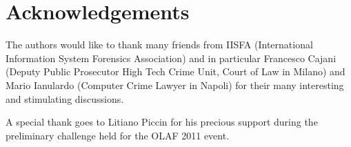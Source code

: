 \documentclass[10pt, conference]{IEEEtran}
\begin{document}
\section*{Acknowledgements}
The authors would like to thank many friends from IISFA (International Information System Forensics Association) and in particular 
Francesco Cajani (Deputy Public Prosecutor High Tech Crime Unit, Court of Law in Milano) and Mario Ianulardo (Computer Crime
Lawyer in Napoli) for their many interesting and stimulating discussions.

A special thank goes to Litiano Piccin for his precious support during the preliminary challenge held for the OLAF 2011 event.


% 

\balance

 

\end{document}
